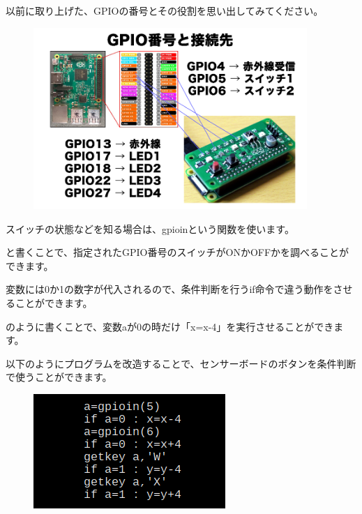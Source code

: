 \begin{description}
    \item {}
\end{description}

以前に取り上げた、GPIOの番号とその役割を思い出してみてください。


\begin{figure}[H]
    \begin{center}
      \includegraphics[keepaspectratio,width=10.372cm,height=6.89cm]{text04-img/s_gpio.png}
    \end{center}
    \label{fig:prog_menu}
\end{figure}

スイッチの状態などを知る場合は、gpioinという関数を使います。

\begin{description}
    \item {}
\end{description}

と書くことで、指定されたGPIO番号のスイッチがONかOFFかを調べることができます。

変数には0か1の数字が代入されるので、条件判断を行うif命令で違う動作をさせることができます。


\begin{description}
    \item {}
    \item {}
\end{description}

のように書くことで、変数aが0の時だけ「x=x-4」を実行させることができます。


以下のようにプログラムを改造することで、センサーボードのボタンを条件判断で使うことができます。

\begin{figure}[H]
    \begin{center}
      \includegraphics[keepaspectratio]{text04-img/s_gpioinif.png}
    \end{center}
    \label{fig:prog_menu}
\end{figure}

